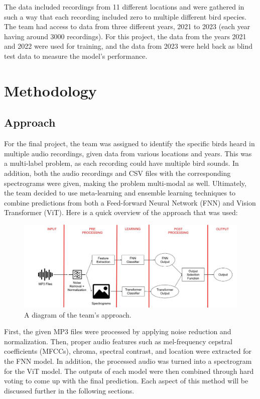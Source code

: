 \documentclass[12pt, conference]{IEEEtran}
\begin{document}
The data included recordings from 11 different locations and were gathered in such a way that each recording included zero to multiple different bird species. The team had access to data from three different years, 2021 to 2023 (each year having around 3000 recordings). For this project, the data from the years 2021 and 2022 were used for training, and the data from 2023 were held back as blind test data to measure the model's performance.

\section{Methodology}
\subsection{Approach}

For the final project, the team was assigned to identify the specific birds heard in multiple audio recordings, given data from various locations and years. This was a multi-label problem, as each recording could have multiple bird sounds. In addition, both the audio recordings and CSV files with the corresponding spectrograms were given, making the problem multi-modal as well. Ultimately, the team decided to use meta-learning and ensemble learning techniques to combine predictions from both a Feed-forward Neural Network (FNN) and Vision Transformer (ViT). Here is a quick overview of the approach that was used:

\begin{figure}[htbp]
\centerline{\includegraphics[width=\columnwidth]{figures/approach_diagram.jpg}}
\caption{A diagram of the team's approach.}
\label{appraoch}
\end{figure}

First, the given MP3 files were processed by applying noise reduction and normalization. Then, proper audio features such as mel-frequency cepstral coefficients (MFCCs), chroma, spectral contrast, and location were extracted for the FNN model. In addition, the processed audio was turned into a spectrogram for the ViT model. The outputs of each model were then combined through hard voting to come up with the final prediction. Each aspect of this method will be discussed further in the following sections.
\end{document}

